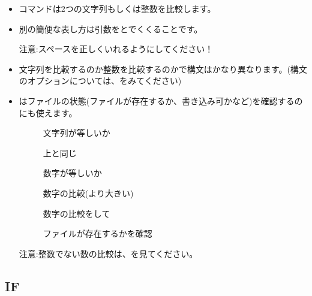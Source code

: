 \documentclass{jsarticle}
\begin{document}
\begin{itemize}

\item {\color{red}}コマンドは2つの文字列もしくは整数を比較します。
\item 別の簡便な表し方は引数を{\color{red}\Q{[}}と{\color{red}\Q{]}}でくくることです。

注意:スペースを正しくいれるようにしてください！

\item 文字列を比較するのか整数を比較するのかで構文はかなり異なります。(構文のオプションについては、{\color{red}}をみてください)

\item {\color{red}}はファイルの状態(ファイルが存在するか、書き込み可かなど)を確認するのにも使えます。

\begin{description}
\item[{\color{red}{\tt test \$a = my}}] 文字列が等しいか 
\item[{\color{red}{\tt [ \$a = my ]}}] 上と同じ
\item[{\color{red}{\tt [ \$a -eq 2 ]}}] 数字が等しいか 
\item[{\color{red}{\tt [ \$a -gt 2 ]}}] 数字の比較(より大きい)
\item[{\color{red}{\tt [ 11 > 2 ]}}] 数字の比較をして{\color{red}{\bf いない}}
\item[{\color{red}{\tt [ -e im1.nii.gnii.gz ]}}] ファイルが存在するかを確認
\end{description}

注意:整数でない数の比較は、{\color{red}}を見てください。

\end{itemize}


\subsection{IF}
\end{document}
